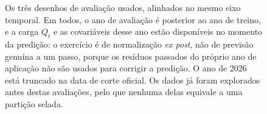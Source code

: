 \begin{figure}[htbp]
  \caption[Os três desenhos de avaliação no tempo]%
  {Os três desenhos de avaliação usados, alinhados no mesmo eixo temporal.
   Em todos, o ano de avaliação é posterior ao ano de treino, e a carga
   $Q_t$ e as covariáveis desse ano estão disponíveis no momento da
   predição: o exercício é de normalização \emph{ex post}, não de previsão
   genuína a um passo, porque os resíduos passados do próprio ano de
   aplicação não são usados para corrigir a predição. O ano de 2026 está
   truncado na data de corte oficial. Os dados já foram explorados antes
   destas avaliações, pelo que nenhuma delas equivale a uma partição selada.}
  \label{fig:desenhos-avaliacao}
\end{figure}
